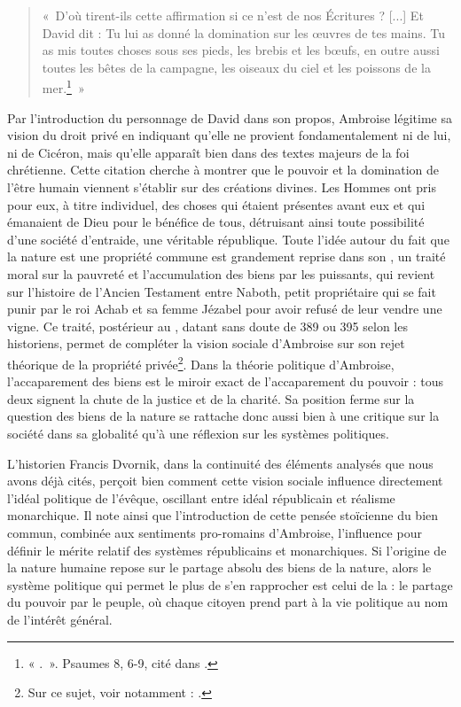 \bigskip

\begin{quote}
    «~D'où tirent-ils cette affirmation si ce n'est de nos Écritures ? [...] Et David dit : Tu lui as donné la domination sur les œuvres de tes mains. Tu as mis toutes choses sous ses pieds, les brebis et les bœufs, en outre aussi toutes les bêtes de la campagne, les oiseaux du ciel et les poissons de la mer.\footnote{« .~». Psaumes 8, 6-9, cité dans \cite[\nopp I, 133]{ambroise_devoirs_1}.}~»
\end{quote}

\bigskip

Par l'introduction du personnage de David dans son propos, Ambroise légitime sa vision du droit privé en indiquant qu'elle ne provient fondamentalement ni de lui, ni de Cicéron, mais qu'elle apparaît bien dans des textes majeurs de la foi chrétienne. Cette citation cherche à montrer que le pouvoir et la domination de l'être humain viennent s'établir sur des créations divines. Les Hommes ont pris pour eux, à titre individuel, des choses qui étaient présentes avant eux et qui émanaient de Dieu pour le bénéfice de tous, détruisant ainsi toute possibilité d'une société d'entraide, une véritable république. Toute l'idée autour du fait que la nature est une propriété commune est grandement reprise dans son , un traité moral sur la pauvreté et l'accumulation des biens par les puissants, qui revient sur l'histoire de l'Ancien Testament entre Naboth, petit propriétaire qui se fait punir par le roi Achab et sa femme Jézabel pour avoir refusé de leur vendre une vigne. Ce traité, postérieur au , datant sans doute de 389 ou 395 selon les historiens, permet de compléter la vision sociale d'Ambroise sur son rejet théorique de la propriété privée\footnote{Sur ce sujet, voir notamment : \cite{vasey_social}.}. Dans la théorie politique d'Ambroise, l'accaparement des biens est le miroir exact de l'accaparement du pouvoir : tous deux signent la chute de la justice et de la charité. Sa position ferme sur la question des biens de la nature se rattache donc aussi bien à une critique sur la société dans sa globalité qu'à une réflexion sur les systèmes politiques.

\bigskip

L'historien Francis Dvornik, dans la continuité des éléments analysés que nous avons déjà cités, perçoit bien comment cette vision sociale influence directement l'idéal politique de l'évêque, oscillant entre idéal républicain et réalisme monarchique. Il note ainsi que l'introduction de cette pensée stoïcienne du bien commun, combinée aux sentiments pro-romains d'Ambroise, l'influence pour définir le mérite relatif des systèmes républicains et monarchiques\autocite[674]{dvornik_political}. Si l'origine de la nature humaine repose sur le partage absolu des biens de la nature, alors le système politique qui permet le plus de s'en rapprocher est celui de la  : le partage du pouvoir par le peuple, où chaque citoyen prend part à la vie politique au nom de l'intérêt général.

